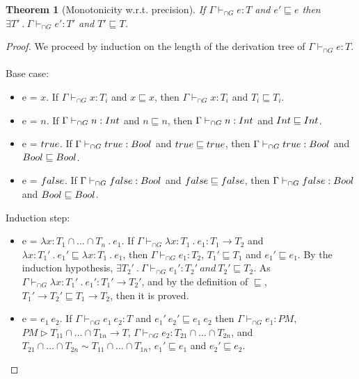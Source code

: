 \documentclass[a4paper]{article}
\newtheorem{theorem}{Theorem}
\begin{document}
\begin{theorem}[Monotonicity w.r.t. precision]
\label{monotonicity}
If $\Gamma \vdash_{\cap G} e : T$ and $e' \sqsubseteq e$ then $\exists T'\ .\ \Gamma \vdash_{\cap G} e' : T'$ and $T' \sqsubseteq T$.
\end{theorem}
\begin{proof}
We proceed by induction on the length of the derivation tree of $\Gamma \vdash_{\cap G} e : T$.\\\\
Base case:
\begin{itemize}
    \item e = $x$.
    If $\Gamma \vdash_{\cap G} x : T_i$ and $x \sqsubseteq x$, then $\Gamma \vdash_{\cap G} x : T_i$ and $T_i \sqsubseteq T_i$.
    \item e = $n$.
    If $\Gamma \vdash_{\cap G} n : {Int}$ and $n \sqsubseteq n$, then $\Gamma \vdash_{\cap G} n : {Int}$ and ${Int} \sqsubseteq {\ensuremath{Int}}$.
    \item e = $true$.
    If $\Gamma \vdash_{\cap G} true : Bool$ and $true \sqsubseteq true$, then $\Gamma \vdash_{\cap G} true : Bool$ and $Bool \sqsubseteq Bool$.
    \item e = $false$.
    If $\Gamma \vdash_{\cap G} false : Bool$ and $false \sqsubseteq false$, then $\Gamma \vdash_{\cap G} false : Bool$ and $Bool \sqsubseteq Bool$.
\end{itemize}
Induction step:
\begin{itemize}
    \item e = $\lambda x : T_1 \cap \ldots \cap T_n\ .\ e_1$.
    If $\Gamma \vdash_{\cap G} \lambda x : T_1\ .\ e_1 : T_1 \rightarrow T_2$ and $\lambda x : T_1'\ .\ e_1' \sqsubseteq \lambda x : T_1\ .\ e_1$, then $\Gamma \vdash_{\cap G} e_1 : T_2$, $T_1' \sqsubseteq T_1$ and $e_1' \sqsubseteq e_1$.
    By the induction hypothesis, $\exists T_2'\ .\ \Gamma \vdash_{\cap G} e_1' : T_2'\ and\ T_2' \sqsubseteq T_2$.
    As $\Gamma \vdash_{\cap G} \lambda x : T_1'\ .\ e_1' : T_1' \rightarrow T_2'$, and by the definition of $\sqsubseteq$, $T_1' \rightarrow T_2' \sqsubseteq T_1 \rightarrow T_2$, then it is proved.
    \item e = $e_1\ e_2$.
    If $\Gamma \vdash_{\cap G} e_1\ e_2 : T$ and $e_1'\ e_2' \sqsubseteq e_1\ e_2$ then $\Gamma \vdash_{\cap G} e_1 : PM$, $PM \rhd T_{11} \cap \ldots \cap T_{1n} \rightarrow T$, $\Gamma \vdash_{\cap G} e_2 : T_{21} \cap \ldots \cap T_{2n}$, and $T_{21} \cap \ldots \cap T_{2n} \sim T_{11} \cap \ldots \cap T_{1n}$, $e_1' \sqsubseteq e_1$ and $e_2' \sqsubseteq e_2$.

\end{itemize}
\end{proof}
\end{document}
